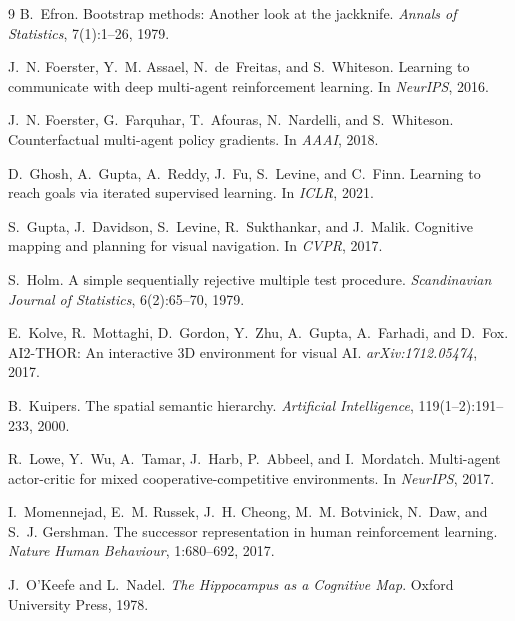 \documentclass{article}
\begin{document}
{\begin{thebibliography}{9}
B.~Efron.
\newblock Bootstrap methods: Another look at the jackknife.
\newblock \emph{Annals of Statistics}, 7(1):1--26, 1979.

J.~N. Foerster, Y.~M. Assael, N.~de~Freitas, and S.~Whiteson.
\newblock Learning to communicate with deep multi-agent reinforcement learning.
\newblock In \emph{NeurIPS}, 2016.

J.~N. Foerster, G.~Farquhar, T.~Afouras, N.~Nardelli, and S.~Whiteson.
\newblock Counterfactual multi-agent policy gradients.
\newblock In \emph{AAAI}, 2018.

D.~Ghosh, A.~Gupta, A.~Reddy, J.~Fu, S.~Levine, and C.~Finn.
\newblock Learning to reach goals via iterated supervised learning.
\newblock In \emph{ICLR}, 2021.

S.~Gupta, J.~Davidson, S.~Levine, R.~Sukthankar, and J.~Malik.
\newblock Cognitive mapping and planning for visual navigation.
\newblock In \emph{CVPR}, 2017.

S.~Holm.
\newblock A simple sequentially rejective multiple test procedure.
\newblock \emph{Scandinavian Journal of Statistics}, 6(2):65--70, 1979.

E.~Kolve, R.~Mottaghi, D.~Gordon, Y.~Zhu, A.~Gupta, A.~Farhadi, and D.~Fox.
\newblock AI2-THOR: An interactive 3D environment for visual AI.
\newblock \emph{arXiv:1712.05474}, 2017.

B.~Kuipers.
\newblock The spatial semantic hierarchy.
\newblock \emph{Artificial Intelligence}, 119(1--2):191--233, 2000.

R.~Lowe, Y.~Wu, A.~Tamar, J.~Harb, P.~Abbeel, and I.~Mordatch.
\newblock Multi-agent actor-critic for mixed cooperative-competitive environments.
\newblock In \emph{NeurIPS}, 2017.

I.~Momennejad, E.~M. Russek, J.~H. Cheong, M.~M. Botvinick, N.~Daw, and S.~J. Gershman.
\newblock The successor representation in human reinforcement learning.
\newblock \emph{Nature Human Behaviour}, 1:680--692, 2017.

J.~O'Keefe and L.~Nadel.
\newblock \emph{The Hippocampus as a Cognitive Map}.
\newblock Oxford University Press, 1978.


\end{thebibliography}}
\end{document}
